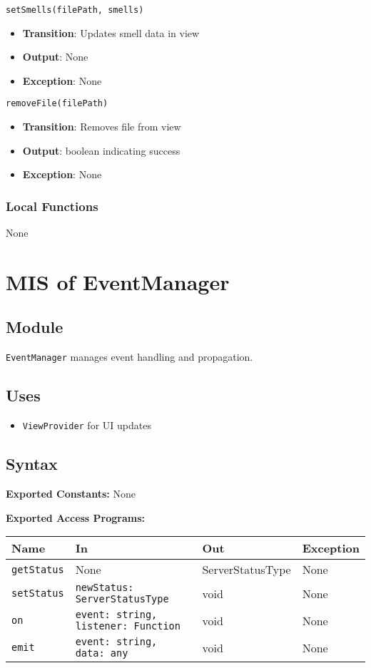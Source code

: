 \documentclass[12pt, titlepage]{article}
\begin{document}
\texttt{setSmells(filePath, smells)}
\begin{itemize}
\item \textbf{Transition}: Updates smell data in view
\item \textbf{Output}: None
\item \textbf{Exception}: None
\end{itemize}

\texttt{removeFile(filePath)}
\begin{itemize}
\item \textbf{Transition}: Removes file from view
\item \textbf{Output}: boolean indicating success
\item \textbf{Exception}: None
\end{itemize}

\subsubsection{Local Functions}
None

\section{MIS of EventManager}

\subsection{Module}
\texttt{EventManager} manages event handling and propagation.

\subsection{Uses}
\begin{itemize}
\item \texttt{ViewProvider} for UI updates
\end{itemize}

\subsection{Syntax}

\textbf{Exported Constants:} None

\textbf{Exported Access Programs:}\\
\begin{tabularx}{\linewidth}{|l|>{\raggedright\arraybackslash}X|l|l|}
  \hline
  \textbf{Name} & \textbf{In} & \textbf{Out} & \textbf{Exception} \\
  \hline
  \texttt{getStatus} & None & ServerStatusType & None \\ \hline
  \texttt{setStatus} & \texttt{newStatus: ServerStatusType} & void & None \\ \hline
  \texttt{on} & \texttt{event: string, listener: Function} & void & None \\ \hline
  \texttt{emit} & \texttt{event: string, data: any} & void & None \\
  \hline
\end{tabularx}
\end{document}
